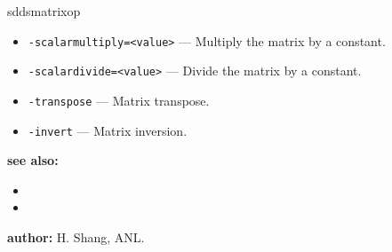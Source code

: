 \begin{sddsprog}{sddsmatrixop}
\begin{itemize}
      \item \verb|-scalarmultiply=<value>| --- Multiply the matrix by a constant.
      \item \verb|-scalardivide=<value>| --- Divide the matrix by a constant.
      \item \verb|-transpose| --- Matrix transpose.
      \item \verb|-invert| --- Matrix inversion.
    \end{itemize}
  \item \textbf{see also:}
    \begin{itemize}
      \item {}
      \item {}
    \end{itemize}
  \item \textbf{author:} H. Shang, ANL.
\end{sddsprog}

